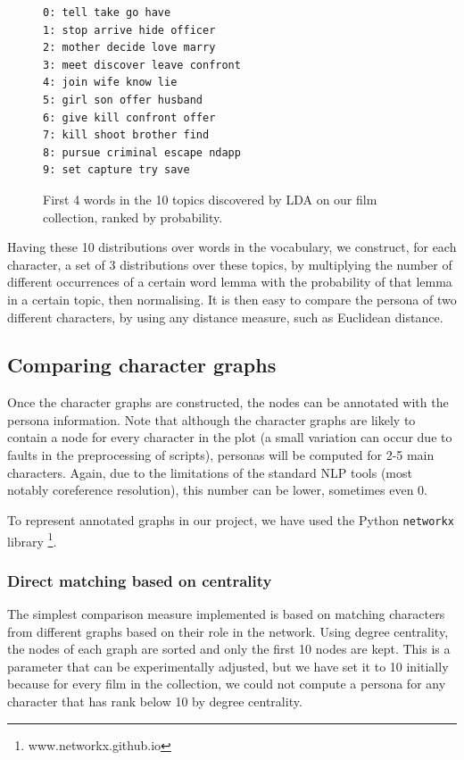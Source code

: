 \documentclass[bsc,frontabs,singlespacing,parskip]{infthesis} %
\begin{document}
\begin{figure}[h]
\centering
\begin{minipage}{8cm}
\begin{Verbatim}[frame=single]
0: tell take go have 
1: stop arrive hide officer 
2: mother decide love marry 
3: meet discover leave confront 
4: join wife know lie 
5: girl son offer husband 
6: give kill confront offer
7: kill shoot brother find 
8: pursue criminal escape ndapp
9: set capture try save 
\end{Verbatim}
\end{minipage}
\caption{First 4 words in the 10 topics discovered by LDA on our film collection, ranked by probability.}
\label{topics}
\end{figure}

Having these 10 distributions over words in the vocabulary, we construct, for each character, a set of 3 distributions over these topics, by multiplying the number of different occurrences of a certain word lemma with the probability of that lemma in a certain topic, then normalising. It is then easy to compare the persona of two different characters, by using any distance measure, such as Euclidean distance.

\subsection{Comparing character graphs}
Once the character graphs are constructed, the nodes can be annotated with the persona information. Note that although the character graphs are likely to contain a node for every character in the plot (a small variation can occur due to faults in the preprocessing of scripts), personas will be computed for 2-5 main characters. Again, due to the limitations of the standard NLP tools (most notably coreference resolution), this number can be lower, sometimes even 0.

To represent annotated graphs in our project, we have used the Python \texttt{networkx} library \footnote{www.networkx.github.io}.

\subsubsection{Direct matching based on centrality}
The simplest comparison measure implemented is based on matching characters from different graphs based on their role in the network. Using degree centrality, the nodes of each graph are sorted and only the first 10 nodes are kept. This is a parameter that can be experimentally adjusted, but we have set it to 10 initially because for every film in the collection, we could not compute a persona for any character that has rank below 10 by degree centrality.
\end{document}
